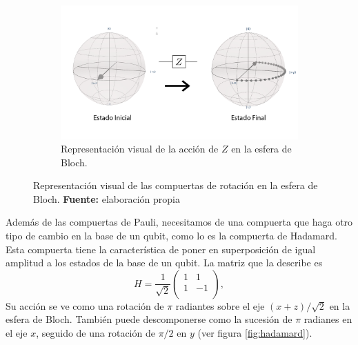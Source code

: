 \documentclass[letterpaper,12pt]{thesisECFM}
\theoremstyle{plain}
\theoremstyle{definition}
\theoremstyle{definition}
\theoremstyle{remark}
\newcommand{\1}{\mathbb{1}}
\begin{document}
\begin{figure}[h!]
    \vspace{1em} %
    \begin{subfigure}{0.45\textwidth}
        \centering
        \includegraphics[width=\linewidth]{imagenes/Pauliz.png}
        \caption{Representación visual de la acción de $Z$ en la esfera de Bloch.}
        \label{fig:choi_p0.9}
    \end{subfigure}
    
    \caption{Representación visual de las compuertas de rotación en la esfera de Bloch. \textbf{Fuente:} elaboración propia}
    \label{fig:rep_pauli}
\end{figure} %

Además de las compuertas de Pauli, necesitamos de una compuerta que haga otro
tipo de cambio en la base de un qubit, como lo es la compuerta de
Hadamard. Esta compuerta tiene la característica de poner en
superposición de igual amplitud a los estados de la base de un qubit.
La matriz que la describe es
\begin{equation}
    H= \frac{1}{\sqrt{2}}
    \begin{pmatrix}
     1& 1 \\
     1& -1 \\
    \end{pmatrix},
\end{equation} 
Su acción se ve como una rotación de $\pi$ radiantes sobre el eje
$(x+z)/\sqrt{2}$ en la esfera de Bloch.  También puede descomponerse como la
sucesión de $\pi$ radianes en el eje $x$, seguido de una rotación de $\pi/2$ en
$y$ (ver figura \ref{fig:hadamard}).
\end{document}
